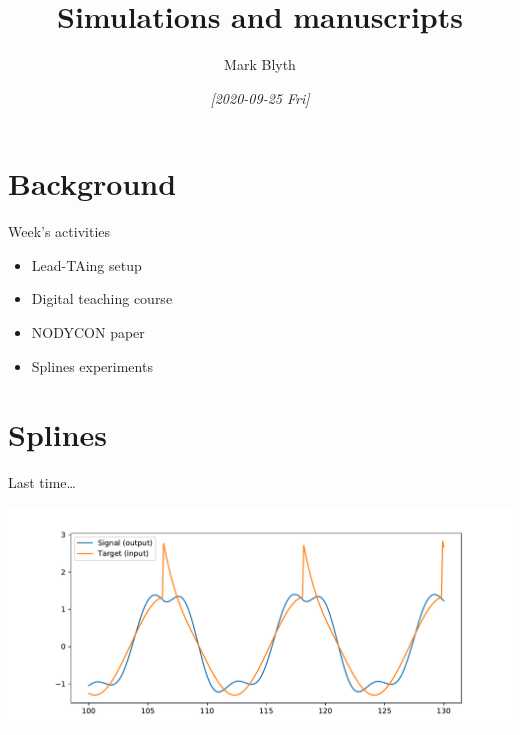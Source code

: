 \documentclass[presentation]{beamer}
\author{Mark Blyth}
\date{\textit{[2020-09-25 Fri]}}
\title{Simulations and manuscripts}
\begin{document}
\maketitle

\section{Background}
\label{sec:org2ead4bb}
\begin{frame}[label={sec:org70c95e1}]{Week's activities}
\begin{itemize}
\item Lead-TAing setup
\end{itemize}
\vfill
\begin{itemize}
\item Digital teaching course
\end{itemize}
\vfill
\begin{itemize}
\item NODYCON paper
\end{itemize}
\vfill
\begin{itemize}
\item Splines experiments
\end{itemize}
\end{frame}

\section{Splines}
\label{sec:org7824778}
\begin{frame}[label={sec:org09a3da9}]{Last time\ldots{}}
\begin{center}
\includegraphics[width=.9\linewidth]{./perturbation.pdf}
\end{center}
\end{frame}
\end{document}
